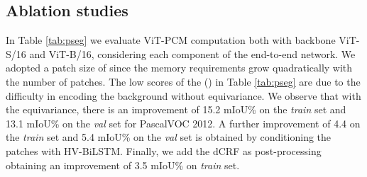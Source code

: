 \documentclass[runningheads]{styles/llncs}
\begin{document}
\subsection{Ablation studies}\label{subsec:ablations}
In Table \ref{tab:pseg} we evaluate ViT-PCM computation both with backbone ViT-S/16 and ViT-B/16, considering each component of the end-to-end network. We adopted a patch size of  since the memory requirements grow quadratically with the number of patches. The low scores of the () in Table \ref{tab:pseg} are due to the difficulty in encoding the background without equivariance. We observe that with the equivariance,  there is an improvement of 15.2 mIoU\% on the \textit{train} set and 13.1 mIoU\% on the \textit{val} set for PascalVOC 2012. A further improvement of 4.4 on the \textit{train} set and 5.4 mIoU\% on the \textit{val} set is obtained by conditioning the patches with HV-BiLSTM. Finally, we add the dCRF\cite{krahenbuhl2011efficient}  as post-processing obtaining an improvement of 3.5 mIoU\% on \textit{train} set. \noindent
\end{document}
